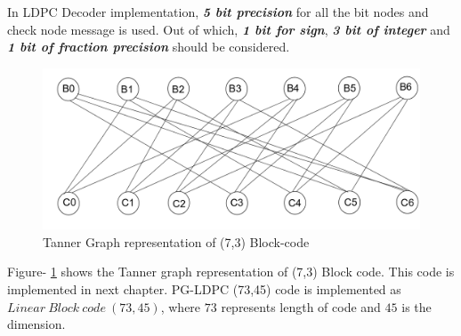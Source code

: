  In LDPC Decoder implementation, \textbf{\textit{5 bit precision}} for all the bit nodes and check node message is used.
 Out of which, \textbf{\textit{1 bit for sign}}, \textbf{\textit{3 bit of integer}} and \textbf{\textit{1 bit of fraction precision}} should be 
 considered. 
 
 
\begin{figure}[H]
  \centering
   \includegraphics[scale=0.4]{./figs/tanner_graph}
  \caption{Tanner Graph representation of (7,3) Block-code}
  \label{tanner_graph}
\end{figure}

 Figure- \ref{tanner_graph} shows the Tanner graph representation of (7,3) Block code. This code is implemented in next chapter.
 PG-LDPC (73,45) code is implemented as $Linear\ Block\ code\ (73,45)$, where $73$ represents length of code and $45$ is the dimension.\\
